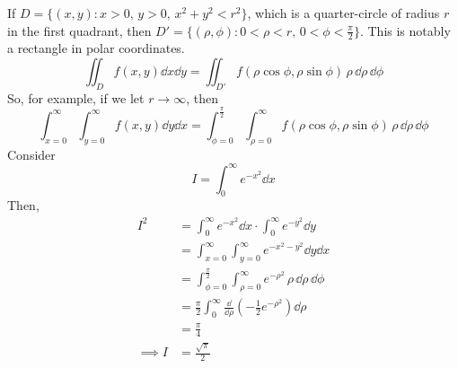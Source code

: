 If \(D = \{ (x, y) \colon x > 0,\, y > 0,\, x^2 + y^2 < r^2 \}\), which is a quarter-circle of radius \(r\) in the first quadrant, then \(D' = \{ (\rho, \phi) \colon 0 < \rho < r,\, 0 < \phi < \frac{\pi}{2} \}\).
This is notably a rectangle in polar coordinates.
\[
	\iint_D f(x, y)\dd{x} \dd{y} = \iint_{D'} f(\rho \cos \phi, \rho \sin \phi) \,\rho \,\dd \rho \,\dd \phi
\]
So, for example, if we let \(r \to \infty\), then
\[
	\int_{x=0}^\infty \int_{y=0}^\infty f(x, y) \dd{y}\dd{x} = \int_{\phi = 0}^{\frac{\pi}{2}} \int_{\rho = 0}^\infty f(\rho \cos \phi, \rho \sin \phi) \,\rho\,\dd \rho\,\dd \phi
\]
Consider
\[
	I = \int_0^\infty e^{-x^2} \dd{x}
\]
Then,
\begin{align*}
	I^2        & = \int_0^\infty e^{-x^2} \dd{x} \cdot \int_0^\infty e^{-y^2} \dd{y}                                \\
	           & = \int_{x=0}^\infty \int_{y=0}^\infty e^{-x^2-y^2} \dd{y}\dd{x}                                    \\
	           & = \int_{\phi = 0}^{\frac{\pi}{2}} \int_{\rho = 0}^\infty e^{-\rho^2} \,\rho\,\dd \rho\,\dd \phi    \\
	           & = \frac{\pi}{2} \int_0^\infty \frac{\dd}{\dd \rho} \left( -\frac{1}{2}e^{-\rho^2} \right) \dd \rho \\
	           & = \frac{\pi}{4}                                                                                    \\
	\implies I & = \frac{\sqrt{\pi}}{2}
\end{align*}
